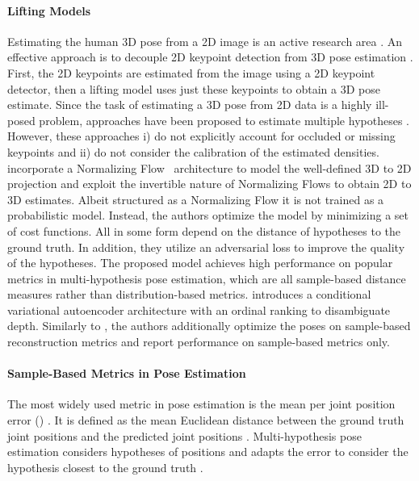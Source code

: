 \documentclass{article} \usepackage{iclr2023_conference,times}
\begin{document}
\paragraph{Lifting Models} Estimating the human 3D pose from a 2D image is an active research area \citep{Pavlakos2016-zj, martinez_2017_3dbaseline, zhaoCVPR19semantic, Wu2022-jb}.
An effective approach is to decouple 2D keypoint detection from 3D pose estimation \citep{martinez_2017_3dbaseline}. First, the 2D keypoints are estimated from the image using a 2D keypoint detector, then a lifting model uses just these keypoints to obtain a 3D pose estimate.
Since the task of estimating a 3D pose from 2D data is a highly ill-posed problem, approaches have been proposed to estimate multiple hypotheses \citep{Li_Hee_Lee_2019, Sharma_Varigonda_Bindal_Sharma_Jain_2019,  Oikarinen_Hannah_Kazerounian_2020, kolotouros2021, Li_Liu_Tang_Wang_Van_Gool_2021, Wehrbein_Rudolph_Rosenhahn_Wandt_2021}.
However, these approaches i) do not explicitly account for occluded or missing keypoints and ii) do not consider the calibration of the estimated densities.
\citet{Wehrbein_Rudolph_Rosenhahn_Wandt_2021} incorporate a Normalizing Flow~\citep{Tabak2000-ie} architecture to model the well-defined 3D to 2D projection and exploit the invertible nature of Normalizing Flows to obtain 2D to 3D estimates.
Albeit structured as a Normalizing Flow it is not trained as a probabilistic model.
Instead, the authors optimize the model by minimizing a set of cost functions. All in some form depend on the distance of hypotheses to the ground truth.
In addition, they utilize an adversarial loss to improve the quality of the hypotheses.
The proposed model achieves high performance on popular metrics in multi-hypothesis pose estimation, which are all sample-based distance measures rather than distribution-based metrics.
\citet{Sharma_Varigonda_Bindal_Sharma_Jain_2019} introduces a conditional variational autoencoder architecture with an ordinal ranking to disambiguate depth.
Similarly to \citet{Wehrbein_Rudolph_Rosenhahn_Wandt_2021}, the authors additionally optimize the poses on sample-based reconstruction metrics and report performance on sample-based metrics only.

\paragraph{Sample-Based Metrics in Pose Estimation} The most widely used metric in pose estimation is the mean per joint position error () \citep{Wang2021-ps}.
It is defined as the mean Euclidean distance between the  ground truth joint positions  and the predicted joint positions .
Multi-hypothesis pose estimation considers  hypotheses of positions  and adapts the error to consider the hypothesis closest to the ground truth \citep{Jahangiri2017-aq}.
\end{document}
